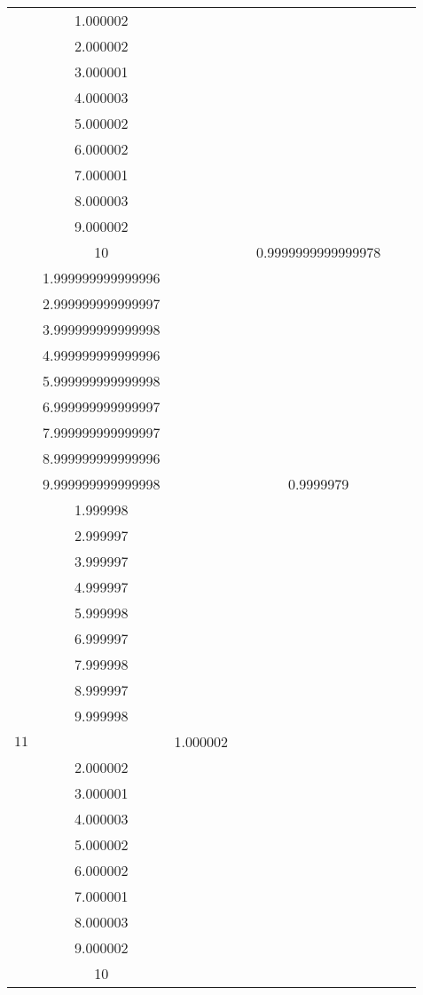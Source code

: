 \documentclass[oneside, final, 12pt]{extarticle}
\begin{document}
\begin{longtable}{|c|c|c|c|c|c|c|}
\begin{aligned}
& 1.000002 \\ & 2.000002 \\ & 3.000001 \\ & 4.000003 \\ & 5.000002 \\ & 6.000002 \\ & 7.000001 \\ & 8.000003 \\ & 9.000002 \\ & 10 
\end{aligned} \)
& \( \begin{aligned}  \end{aligned} \) 
& \( \begin{aligned}
& 0.9999999999999978 \\ & 1.999999999999996 \\ & 2.999999999999997 \\ & 3.999999999999998 \\ & 4.999999999999996 \\ & 5.999999999999998 \\ & 6.999999999999997 \\ & 7.999999999999997 \\ & 8.999999999999996 \\ & 9.999999999999998 
\end{aligned} \)
& \( \begin{aligned}  \end{aligned} \) 
& \( \begin{aligned}
& 0.9999979 \\ & 1.999998 \\ & 2.999997 \\ & 3.999997 \\ & 4.999997 \\ & 5.999998 \\ & 6.999997 \\ & 7.999998 \\ & 8.999997 \\ & 9.999998 
\end{aligned} \)
& \( \begin{aligned}  \end{aligned} \) 
\\ \hline
    \(11\) & \( \begin{aligned}
& 1.000002 \\ & 2.000002 \\ & 3.000001 \\ & 4.000003 \\ & 5.000002 \\ & 6.000002 \\ & 7.000001 \\ & 8.000003 \\ & 9.000002 \\ & 10 

\end{aligned}
\end{longtable}
\end{document}
